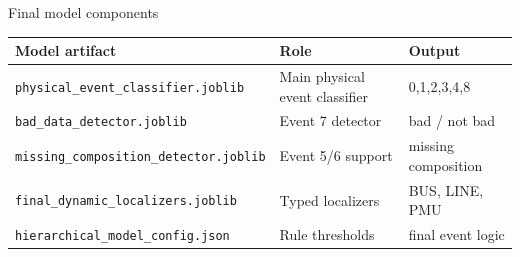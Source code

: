\documentclass[10pt,aspectratio=169]{beamer}
\newcommand{\code}[1]{\texttt{\footnotesize #1}}
\begin{document}
\begin{frame}{Final model components}
\small
\centering
\begin{tabular}{p{}p{}p{}}
\toprule
\textbf{Model artifact} & \textbf{Role} & \textbf{Output}\\
\midrule
\code{physical\_event\_classifier.joblib} & Main physical event classifier & 0,1,2,3,4,8\\
\code{bad\_data\_detector.joblib} & Event 7 detector & bad / not bad\\
\code{missing\_composition\_detector.joblib} & Event 5/6 support & missing composition\\
\code{final\_dynamic\_localizers.joblib} & Typed localizers & BUS, LINE, PMU\\
\code{hierarchical\_model\_config.json} & Rule thresholds & final event logic\\
\bottomrule
\end{tabular}
\end{frame}
\end{document}

